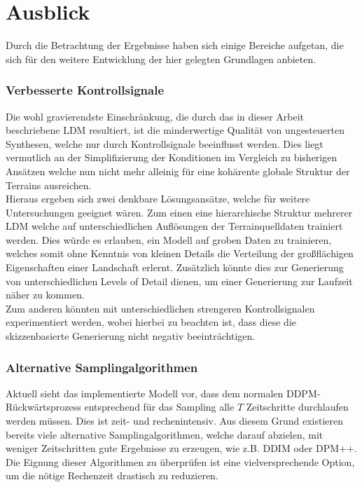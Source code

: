 \section{Ausblick}

Durch die Betrachtung der Ergebnisse haben sich einige Bereiche aufgetan, die sich für den weitere Entwicklung der hier gelegten Grundlagen anbieten.  

\subsubsection{Verbesserte Kontrollsignale}

Die wohl gravierendste Einschränkung, die durch das in dieser Arbeit beschriebene \ac{LDM} resultiert, ist die minderwertige Qualität von ungesteuerten Synthesen, welche nur durch Kontrollsignale beeinflusst werden. Dies liegt vermutlich an der Simplifizierung der Konditionen im Vergleich zu bisherigen Ansätzen welche nun nicht mehr alleinig für eine kohärente globale Struktur der Terrains ausreichen. \\
Hieraus ergeben sich zwei denkbare Lösungsansätze, welche für weitere Untersuchungen geeignet wären. Zum einen eine hierarchische Struktur mehrerer \ac{LDM} welche auf unterschiedlichen Auflösungen der Terrainquelldaten trainiert werden. Dies würde es erlauben, ein Modell auf groben Daten zu trainieren, welches somit ohne Kenntnis von kleinen Details die Verteilung der großflächigen Eigenschaften einer Landschaft erlernt. Zusätzlich könnte dies zur Generierung von unterschiedlichen Levels of Detail dienen, um einer Generierung zur Laufzeit näher zu kommen.\\
Zum anderen könnten mit unterschiedlichen strengeren Kontrollsignalen experimentiert werden, wobei hierbei zu beachten ist, dass diese die skizzenbasierte Generierung nicht negativ beeinträchtigen.  

\subsubsection{Alternative Samplingalgorithmen}

Aktuell sieht das implementierte Modell vor, dass dem normalen DDPM-Rückwärtsprozess entsprechend für das Sampling alle $T$ Zeitschritte durchlaufen werden müssen. Dies ist zeit- und rechenintensiv. Aus diesem Grund existieren bereits viele alternative Samplingalgorithmen, welche darauf abzielen, mit weniger Zeitschritten gute Ergebnisse zu erzeugen, wie z.B. DDIM oder DPM++. Die Eignung dieser Algorithmen zu überprüfen ist eine vielversprechende Option, um die nötige Rechenzeit drastisch zu reduzieren.

